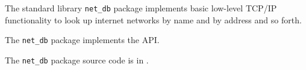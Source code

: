 
The standard library {\tt net\_db} package implements basic low-level {\sc TCP/IP} 
functionality to look up internet networks by name and by address and so forth.

The {\tt net\_db} package implements the  API.

The {\tt net\_db} package source code is in .

